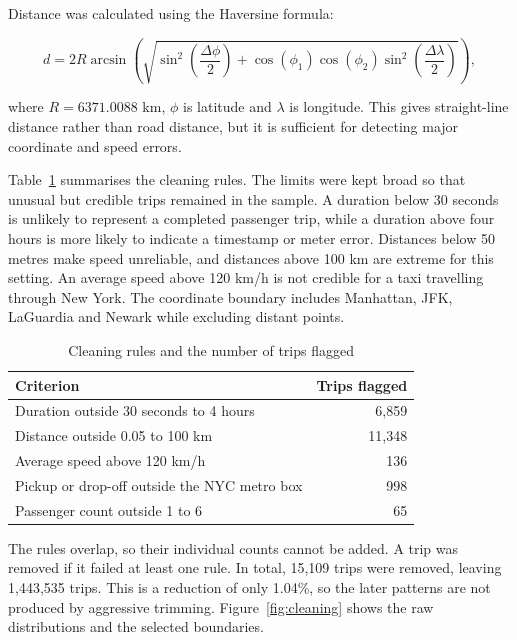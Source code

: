 \documentclass{article}
\begin{document}
Distance was calculated using the Haversine formula:

\begin{equation}
  d = 2R\arcsin\left(\sqrt{
  \sin^2\left(\frac{\Delta\phi}{2}\right) +
  \cos(\phi_1)\cos(\phi_2)
  \sin^2\left(\frac{\Delta\lambda}{2}\right)}\right),
\end{equation}

where $R=6371.0088$ km, $\phi$ is latitude and $\lambda$ is longitude. This
gives straight-line distance rather than road distance, but it is sufficient
for detecting major coordinate and speed errors.

Table~\ref{tab:cleaning} summarises the cleaning rules. The limits were kept
broad so that unusual but credible trips remained in the sample. A duration
below 30 seconds is unlikely to represent a completed passenger trip, while a
duration above four hours is more likely to indicate a timestamp or meter
error. Distances below 50 metres make speed unreliable, and distances above
100 km are extreme for this setting. An average speed above 120 km/h is not
credible for a taxi travelling through New York. The coordinate boundary
includes Manhattan, JFK, LaGuardia and Newark while excluding distant points.

\begin{table}[H]
  \caption{Cleaning rules and the number of trips flagged}
  \label{tab:cleaning}
  \centering
  \small
  \begin{tabular}{lr}
    \toprule
    Criterion & Trips flagged \\
    \midrule
    Duration outside 30 seconds to 4 hours & 6,859 \\
    Distance outside 0.05 to 100 km & 11,348 \\
    Average speed above 120 km/h & 136 \\
    Pickup or drop-off outside the NYC metro box & 998 \\
    Passenger count outside 1 to 6 & 65 \\
    \bottomrule
  \end{tabular}
\end{table}

The rules overlap, so their individual counts cannot be added. A trip was
removed if it failed at least one rule. In total, 15,109 trips were removed,
leaving 1,443,535 trips. This is a reduction of only 1.04\%, so the later
patterns are not produced by aggressive trimming. Figure~\ref{fig:cleaning}
shows the raw distributions and the selected boundaries.
\end{document}
